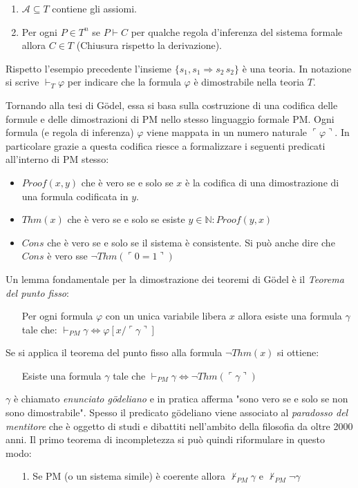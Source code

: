 \documentclass[./main.tex]{subfiles}
\begin{document}
\begin{enumerate}
  \item $\mathcal{A} \subseteq T$ contiene gli assiomi.
  \item Per ogni $P \in T^n$ se $P \vdash C$ per qualche regola d'inferenza del sistema formale allora $C \in T$ (Chiusura rispetto la derivazione). 
\end{enumerate}

Rispetto l'esempio precedente l'insieme $\{s_1, s_1 \Rightarrow s_2\, s_2\}$ è una teoria.
In notazione si scrive $\vdash_T \varphi$ per indicare che la formula $\varphi$ è dimostrabile nella teoria $T$.


Tornando alla tesi di Gödel, essa si basa sulla costruzione di una codifica delle formule e delle dimostrazioni
di PM nello stesso linguaggio formale PM. 
Ogni formula (e regola di inferenza) $\varphi$ viene mappata in un numero naturale $\ulcorner  \varphi \urcorner $.
In particolare grazie a questa codifica riesce a formalizzare i seguenti predicati all'interno di PM stesso:
\begin{itemize}
  \item $Proof(x, y)$ che è vero se e solo se $x$ è la codifica di una dimostrazione di una formula codificata in $y$.
  \item $Thm(x)$ che è vero se e solo se esiste $y\in \mathbb{N} : Proof(y, x)$
  \item $Cons$ che è vero se e solo se il sistema è consistente. Si può anche dire che $Cons$ è vero sse $\lnot Thm(\ulcorner 0 = 1 \urcorner)$
\end{itemize}

Un lemma fondamentale per la dimostrazione dei teoremi di Gödel è il \textit{Teorema del punto fisso}:
\begin{enumerate}
  \item[] Per ogni formula $\varphi$ con un unica variabile libera $x$ allora esiste una formula $\gamma$ tale che:
  $\vdash_{PM} \gamma \Leftrightarrow \varphi[x/\ulcorner \gamma \urcorner]$
\end{enumerate}

Se si applica il teorema del punto fisso alla formula $\lnot Thm(x)$ si ottiene:
\begin{enumerate}
  \item[] Esiste una formula $\gamma$ tale che $\vdash_{PM} \gamma \Leftrightarrow \lnot Thm(\ulcorner \gamma \urcorner)$
\end{enumerate}

$\gamma$ è chiamato \textit{enunciato gödeliano} e in pratica afferma "sono vero se e solo se non sono dimostrabile".
Spesso il predicato gödeliano viene associato al \textit{paradosso del mentitore} che è oggetto 
di studi e dibattiti nell'ambito della filosofia da oltre 2000 anni.
Il primo teorema di incompletezza si può quindi riformulare in questo modo:
\begin{enumerate}
  \item[1.] Se PM (o un sistema simile) è coerente allora $\nvdash_{PM} \gamma$ e $\nvdash_{PM} \lnot\gamma$
\end{enumerate}
\end{document}
